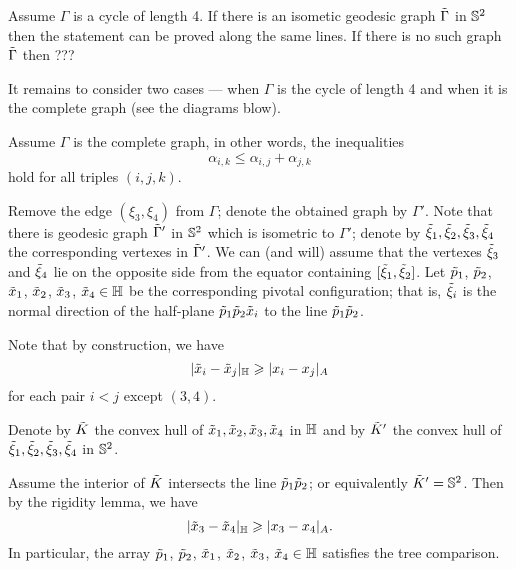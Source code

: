 Assume $\Gamma$ is a cycle of length 4.
If there is an isometic geodesic graph $\~\Gamma$ in $\SS^2$ then the statement can be proved along the same lines.
If there is no such graph $\~\Gamma$ then ???

\hide
\begin{wrapfigure}{r}{14 mm}
\end{wrapfigure}
\unhide

It remains to consider two cases --- when $\Gamma$ is the cycle of length 4 and when it is the complete graph (see the diagrams blow). 

Assume $\Gamma$ is the complete graph, in other words, the inequalities 
\[\alpha_{i,k}\le \alpha_{i,j}+\alpha_{j,k}\]
hold for all triples $(i,j,k)$.

Remove the edge $(\xi_3,\xi_4)$ from $\Gamma$;
denote the obtained graph by $\Gamma'$.
Note that there is geodesic graph $\~\Gamma'$ in $\SS^2$ which is isometric to $\Gamma'$;
denote by $\~\xi_1,\~\xi_2,\~\xi_3,\~\xi_4$ the corresponding vertexes in $\~\Gamma'$.
We can (and will) assume that the vertexes $\~\xi_3$ and $\~\xi_4$ lie on the opposite side from the equator containing $[\~\xi_1,\~\xi_2]$.
Let $\~p_1$, $\~p_2$, $\~x_1$, $\~x_2$, $\~x_3$, $\~x_4\in \HH$ be the corresponding pivotal configuration;
that is, $\~\xi_i$ is the normal direction of the half-plane $\~p_1\~p_2\~x_i$ to the line $\~p_1\~p_2$.

Note that by construction, we have 
\[|\~x_i-\~x_j|_\HH\ge|x_i-x_j|_A\]
for each pair $i<j$ except $(3,4)$.


Denote by $\~K$ the convex hull of $\~x_1,\~x_2,\~x_3,\~x_4$ in $\HH$
and by $\~K'$ the convex hull of $\~\xi_1,\~\xi_2,\~\xi_3,\~\xi_4$ in $\SS^2$.


Assume the interior of $\~K$ intersects the line $\~p_1\~p_2$;
or equivalently $\~K'=\SS^2$.
Then by the rigidity lemma, we have 
\[|\~x_3-\~x_4|_\HH\ge|x_3-x_4|_A.\]
In particular, the array $\~p_1$, $\~p_2$, $\~x_1$, $\~x_2$, $\~x_3$, $\~x_4\in \HH$ satisfies the tree comparison.

